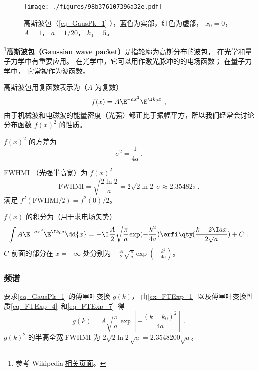 

\begin{figure}[ht]
\centering
\texttt{[image: ./figures/98b376107396a32e.pdf]}
\caption{高斯波包（\autoref{eq_GausPk_1} ），蓝色为实部，红色为虚部， $x_0 = 0$， $A = 1$， $a = 1/20$， $k_0 = 5$。} \label{fig_GausPk_1}
\end{figure}

\footnote{参考 Wikipedia \href{https://en.wikipedia.org/wiki/Wave_packet}{相关页面}。}\textbf{高斯波包（Gaussian wave packet）}是指轮廓为高斯分布的波包， 在光学和量子力学中有重要应用。 在光学中，它可以用作激光脉冲的的电场函数； 在量子力学中， 它常被作为波函数。

高斯波包用复函数表示为（$A$ 为复数）
\begin{equation}\label{eq_GausPk_1}
f(x) = A \E^{-a x^2}\E^{\I k_0 x}~,
\end{equation}
由于机械波和电磁波的能量密度（光强）都正比于振幅平方，所以我们经常会讨论分布函数 $f(x)^2$ 的性质。

$f(x)^2$ 的方差为
\begin{equation}
\sigma^2= \frac{1}{4a}~.
\end{equation}

FWHMI （光强半高宽）为 $f(x)^2$
\begin{equation}
\mathrm{FWHMI} = \sqrt{\frac{2\ln 2}{a}} = 2\sqrt{2\ln 2}\ \sigma \approx 2.35482\sigma~.
\end{equation}
满足 $f^2(\text{FWHMI/2}) = f^2(0)/2$。

$f(x)$ 的积分为（用于求电场矢势）
\begin{equation}\label{eq_GausPk_3} %
\int A \E^{-a x^2}\E^{\I k_0 x} \dd{x} = -\I\frac{A}{2} \sqrt{\frac{\pi}{a}} \exp(-\frac{k^2}{4a}) \erfi\qty(\frac{k + 2 \I a x}{2 \sqrt{a}}) + C~.
\end{equation}
$C$ 前面的部分在 $x = \pm \infty$ 处分别为 $\pm\frac{A}{2} \sqrt{\frac{\pi}{a}} \exp(-\frac{k^2}{4a})$。%

\subsubsection{频谱}

要求\autoref{eq_GausPk_1} 的傅里叶变换 $g(k)$， 由\autoref{ex_FTExp_1}~以及傅里叶变换性质\autoref{eq_FTExp_4}~和\autoref{eq_FTExp_7}~得
\begin{equation} %
g(k) = A\sqrt{\frac{\pi}{a}} \exp[-\frac{(k-k_0)^2}{4a}]~.
\end{equation}
$g(k)^2$ 的半高全宽 FWHMI 为 $2\sqrt{2\ln 2}\sqrt{a} = 2.3548200 \sqrt{a}$。

